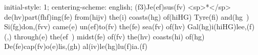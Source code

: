 initial-style: 1;
centering-scheme: english;
(f3)Je(ef)sus(fv) <sp>*</sp> de(hv)part(fhf)ing(fe) from(hijv) the(i) coasts(hg) of(hiHG) Tyre(fi) and(hg~) Si(fg)don,(fvv) came(e) un(ef)to(fv) the(fe) sea(fv) of(hv) Gal(hg)i(hiHG)lee,(f) (,) through(e) the(ef~) midst(fe) of(fv) the(hv) coasts(hi) of(hg) De(fe)cap(fv)o(e)lis,(gh) al(iv)le(hg)lu(f)ia.(f)
